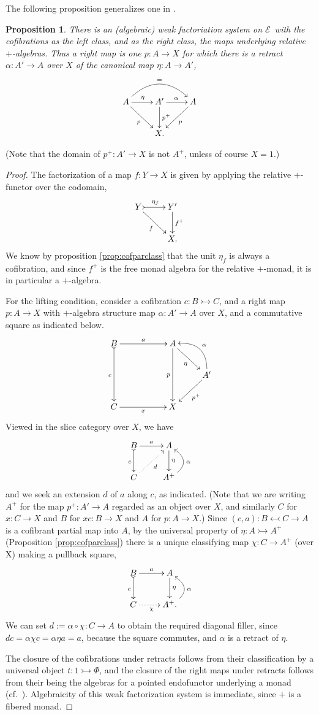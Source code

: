 \documentclass[11pt,reqno]{amsart}
\newcommand{\EE}{\ensuremath{\mathcal{E}}}
\newcommand{\mono}{\ensuremath{\rightarrowtail}}
\newcommand{\ra}{\ensuremath{\rightarrow}}
\newcommand{\cof}{\ensuremath{\rightarrowtail}}
\renewcommand{\to}{\ensuremath{\rightarrow}}
\newtheorem{proposition}[theorem]{Proposition}
\theoremstyle{remark}
\theoremstyle{definition}
\begin{document}
The following proposition generalizes one in \cite{bourke-garner-I}.
\begin{proposition}
There is an (algebraic) weak factoriation system on \EE\ with the cofibrations as the left class, and as the right class, the maps underlying relative $+$-algebras.  Thus a right map is one $p : A\ra X$ for which there is a retract $\alpha : A'\ra A$ over $X$ of the canonical map $\eta : A\ra A'$,
\[
\xymatrix{
A\ar[rd]_{p} \ar[r]^{\eta} \ar@/^5ex/ [rr]^= & A' \ar[r]^{\alpha} \ar[d]^-{p^+} & \ar[ld]^{p} A \\
& X. &
}
\]
\end{proposition}
%
\noindent (Note that the domain of $p^+ : A' \to X$ is not $A^+$, unless of course $X = 1$.)
\begin{proof}
The factorization of a map $f : Y\ra X$ is given by applying the relative $+$-functor over the codomain,
\[
\xymatrix{
Y\ar[rd]_{f} \ar@{>->}[r]^{\eta_f} & Y' \ar[d]^-{f^{+}} \\
& X. 
}
\]
We know by proposition \ref{prop:cofparclass} that the unit $\eta_f$ is always a cofibration, and since $f^{+}$ is the free monad algebra for the relative $+$-monad, it is in particular a $+$-algebra.

For the lifting condition, consider a cofibration $c : B\mono C$, and a right map $p:A\ra X$ with $+$-algebra structure map $\alpha: A' \ra A$ over $X$, and a commutative square as indicated below.
\[
\xymatrix{
B \ar@{>->}[dd]_{c} \ar[rr]^{a}  && A \ar[dd]_p \ar[rd]_{\eta} & \\
 &&& A' \ar@/_4ex/ [lu]_\alpha  \ar[ld]^{p^+} \\
C \ar[rr]_{x} && X &
}
\]
Viewed in the slice category over $X$, we have
\[
\xymatrix{
B\ar@{>->}[d]_{c} \ar[r]^{a} & A \ar[d]^-{\eta} \\
C \ar@{.>}[ru]_{d} & A^+ \ar@/_4ex/ [u]_\alpha
}
\]
and we seek an extension $d$ of $a$ along $c$, as indicated.  (Note that we are writing $A^+$ for the map $p^+ : A'\to A$ regarded as an object over $X$, and similarly $C$ for $x : C\to X$ and $B$ for $xc : B\to X$ and $A$ for $p:A\to X$.)
Since $(c,a) : B \leftarrowtail C \ra A$ is a cofibrant partial map into $A$, by the universal property of $\eta : A \cof A^+$ (Proposition \ref{prop:cofparclass}) there is a unique classifying map $\chi : C \ra A^+$ (over X) making a pullback square,
\[
\xymatrix{
B\ar@{>->}[d]_{c} \ar[r]^{a} & A \ar[d]^-{\eta} \\
C \ar@{.>}[r]_{\chi} & A^+. \ar@/_4ex/ [u]_\alpha
}
\]
We can set $d := \alpha\circ \chi : C \ra A$ to obtain the required diagonal filler, since $dc = \alpha\chi{c} = \alpha\eta{a} = a$, because the square commutes, and $\alpha$ is a retract of $\eta$.

The closure of the cofibrations under retracts follows from their classification by a universal object $t : 1 \cof \Phi$, and the closure of the right maps under retracts follows from their being the algebras for a pointed endofunctor underlying a monad (cf.~\cite{Riehl}).  Algebraicity of this weak factorization system is immediate, since $+$ is a fibered monad.
\end{proof}
\end{document}
